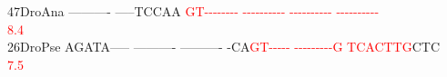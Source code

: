 \documentclass[11pt,twoside,reqno,a4paper]{article}
\begin{document}
{47\hspace*{2\charwidth}DroAna	----------	-----TCCAA	\textcolor{Red}{G}\textcolor{Red}{T}\textcolor{Red}{-}\textcolor{Red}{-}\textcolor{Red}{-}\textcolor{Red}{-}\textcolor{Red}{-}\textcolor{Red}{-}\textcolor{Red}{-}\textcolor{Red}{-}	\textcolor{Red}{-}\textcolor{Red}{-}\textcolor{Red}{-}\textcolor{Red}{-}\textcolor{Red}{-}\textcolor{Red}{-}\textcolor{Red}{-}\textcolor{Red}{-}\textcolor{Red}{-}\textcolor{Red}{-}	\textcolor{Red}{-}\textcolor{Red}{-}\textcolor{Red}{-}\textcolor{Red}{-}\textcolor{Red}{-}\textcolor{Red}{-}\textcolor{Red}{-}\textcolor{Red}{-}\textcolor{Red}{-}\textcolor{Red}{-}	\textcolor{Red}{-}\textcolor{Red}{-}\textcolor{Red}{-}\textcolor{Red}{-}\textcolor{Red}{-}\textcolor{Red}{-}\textcolor{Red}{-}\textcolor{Red}{-}\textcolor{Red}{-}\textcolor{Red}{-}	\\
\hspace*{4\charwidth}\hspace*{7\charwidth}\hspace*{1\charwidth}\hspace*{1\charwidth}\hspace*{20\charwidth}\textcolor{Red}{8.4}\hspace*{1\charwidth}\hspace*{1\charwidth}\hspace*{1\charwidth}\hspace*{1\charwidth}\\
26\hspace*{2\charwidth}DroPse	AGATA-----	----------	----------	-CA\textcolor{Red}{G}\textcolor{Red}{T}\textcolor{Red}{-}\textcolor{Red}{-}\textcolor{Red}{-}\textcolor{Red}{-}\textcolor{Red}{-}	\textcolor{Red}{-}\textcolor{Red}{-}\textcolor{Red}{-}\textcolor{Red}{-}\textcolor{Red}{-}\textcolor{Red}{-}\textcolor{Red}{-}\textcolor{Red}{-}\textcolor{Red}{-}\textcolor{Red}{G}	\textcolor{Red}{T}\textcolor{Red}{C}\textcolor{Red}{A}\textcolor{Red}{C}\textcolor{Red}{T}\textcolor{Red}{T}\textcolor{Red}{G}CTC	\\
\hspace*{4\charwidth}\hspace*{7\charwidth}\hspace*{1\charwidth}\hspace*{1\charwidth}\hspace*{1\charwidth}\hspace*{33\charwidth}\textcolor{Red}{7.5}\hspace*{1\charwidth}\hspace*{1\charwidth}\hspace*{1\charwidth}\\
}
\end{document}
